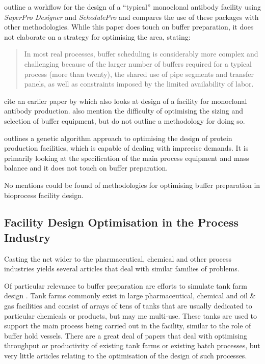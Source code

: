 \citet{Petrides:2014} outline a workflow for 
the design of a ``typical'' monoclonal antibody facility using 
\emph{SuperPro Designer\textsuperscript{\textregistered}} and
\emph{SchedulePro\textsuperscript{\textregistered}} and compares the use of
these packages with other methodologies.
While this paper does touch on buffer preparation,
it does not elaborate on a strategy for optimising the area, stating:
\begin{quote}In most real processes, buffer scheduling is considerably more
complex and challenging because of the larger number of buffers required for a
typical process (more than twenty), the shared use of pipe segments and transfer
panels, as well as constraints imposed by the limited availability of labor.
\end{quote}
\citet{Petrides:2014} cite an earlier paper by \citet{Toumi:2010} which also
looks at design of a facility for monoclonal antibody production.
\citet{Toumi:2010} also mention the difficulty of optimising the sizing and 
selection of buffer equipment, but do not outline a methodology for doing so.

\citet{Dietz:2008} outlines a genetic algorithm approach to optimising the 
design of protein production facilities, which is capable of dealing with
imprecise demands.  It is primarily looking at the specification of the main
process equipment and mass balance and it does not touch on buffer preparation.

No mentions could be found of methodologies for optimising buffer preparation in
bioprocess facility design.

\subsection{Facility Design Optimisation in the Process Industry}
\label{SS.fdopi}
Casting the net wider to the pharmaceutical, chemical and other process
industries yields several articles that deal with similar families of problems.

Of particular relevance to buffer preparation are efforts to simulate tank farm
design \citep{Al-Otaibi:2004, Stewart:2005, Sharda:2009, Terrazas-Moreno:2012}.
Tank farms commonly exist in large pharmaceutical, chemical and oil \&
gas facilities and consist of arrays of tens of tanks that are usually dedicated
to particular chemicals or products, but may me multi-use.  These tanks are used
to support the main process being carried out in the facility, similar to the
role of buffer hold vessels.  There are a great deal of papers that deal with
optimising throughput or productivity of existing tank farms or existing batch
processes, but very little articles relating to the optimisation of the design
of such processes.

